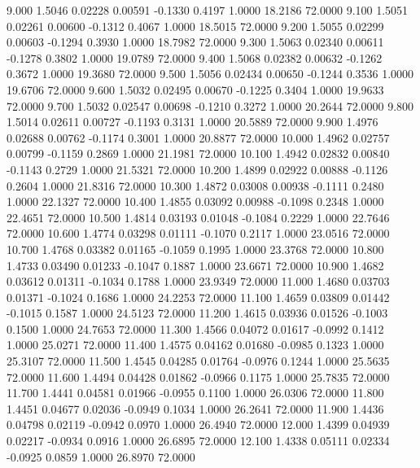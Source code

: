    9.000   1.5046   0.02228   0.00591  -0.1330   0.4197   1.0000  18.2186  72.0000
   9.100   1.5051   0.02261   0.00600  -0.1312   0.4067   1.0000  18.5015  72.0000
   9.200   1.5055   0.02299   0.00603  -0.1294   0.3930   1.0000  18.7982  72.0000
   9.300   1.5063   0.02340   0.00611  -0.1278   0.3802   1.0000  19.0789  72.0000
   9.400   1.5068   0.02382   0.00632  -0.1262   0.3672   1.0000  19.3680  72.0000
   9.500   1.5056   0.02434   0.00650  -0.1244   0.3536   1.0000  19.6706  72.0000
   9.600   1.5032   0.02495   0.00670  -0.1225   0.3404   1.0000  19.9633  72.0000
   9.700   1.5032   0.02547   0.00698  -0.1210   0.3272   1.0000  20.2644  72.0000
   9.800   1.5014   0.02611   0.00727  -0.1193   0.3131   1.0000  20.5889  72.0000
   9.900   1.4976   0.02688   0.00762  -0.1174   0.3001   1.0000  20.8877  72.0000
  10.000   1.4962   0.02757   0.00799  -0.1159   0.2869   1.0000  21.1981  72.0000
  10.100   1.4942   0.02832   0.00840  -0.1143   0.2729   1.0000  21.5321  72.0000
  10.200   1.4899   0.02922   0.00888  -0.1126   0.2604   1.0000  21.8316  72.0000
  10.300   1.4872   0.03008   0.00938  -0.1111   0.2480   1.0000  22.1327  72.0000
  10.400   1.4855   0.03092   0.00988  -0.1098   0.2348   1.0000  22.4651  72.0000
  10.500   1.4814   0.03193   0.01048  -0.1084   0.2229   1.0000  22.7646  72.0000
  10.600   1.4774   0.03298   0.01111  -0.1070   0.2117   1.0000  23.0516  72.0000
  10.700   1.4768   0.03382   0.01165  -0.1059   0.1995   1.0000  23.3768  72.0000
  10.800   1.4733   0.03490   0.01233  -0.1047   0.1887   1.0000  23.6671  72.0000
  10.900   1.4682   0.03612   0.01311  -0.1034   0.1788   1.0000  23.9349  72.0000
  11.000   1.4680   0.03703   0.01371  -0.1024   0.1686   1.0000  24.2253  72.0000
  11.100   1.4659   0.03809   0.01442  -0.1015   0.1587   1.0000  24.5123  72.0000
  11.200   1.4615   0.03936   0.01526  -0.1003   0.1500   1.0000  24.7653  72.0000
  11.300   1.4566   0.04072   0.01617  -0.0992   0.1412   1.0000  25.0271  72.0000
  11.400   1.4575   0.04162   0.01680  -0.0985   0.1323   1.0000  25.3107  72.0000
  11.500   1.4545   0.04285   0.01764  -0.0976   0.1244   1.0000  25.5635  72.0000
  11.600   1.4494   0.04428   0.01862  -0.0966   0.1175   1.0000  25.7835  72.0000
  11.700   1.4441   0.04581   0.01966  -0.0955   0.1100   1.0000  26.0306  72.0000
  11.800   1.4451   0.04677   0.02036  -0.0949   0.1034   1.0000  26.2641  72.0000
  11.900   1.4436   0.04798   0.02119  -0.0942   0.0970   1.0000  26.4940  72.0000
  12.000   1.4399   0.04939   0.02217  -0.0934   0.0916   1.0000  26.6895  72.0000
  12.100   1.4338   0.05111   0.02334  -0.0925   0.0859   1.0000  26.8970  72.0000
